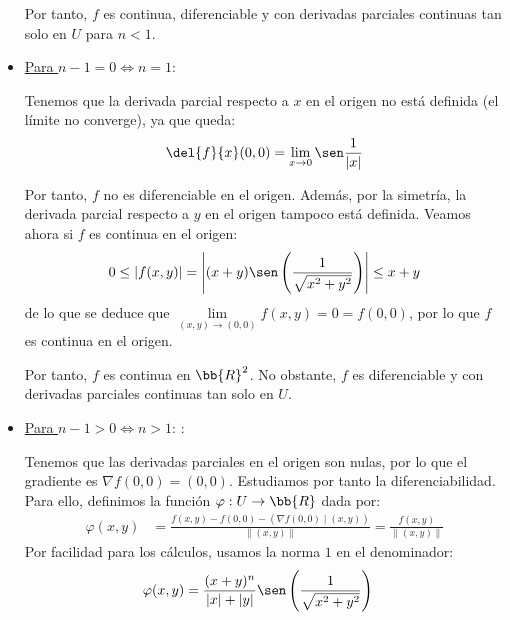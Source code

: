 \begin{ejercicio}
\begin{itemize}
        Por tanto, $f$ es continua, diferenciable y con derivadas parciales continuas tan solo en $U$ para $n<1$.

        \item \ul{Para $n-1=0 \Longleftrightarrow n=1$}:

        Tenemos que la derivada parcial respecto a $x$ en el origen no está definida (el límite no converge), ya que queda:
        \begin{equation*}
            \del{f}{x}(0,0) = \lim_{x\to 0} \sen\frac{1}{|x|}
        \end{equation*}
        
        Por tanto, $f$ no es diferenciable en el origen. Además, por la simetría, la derivada parcial respecto a $y$ en el origen tampoco está definida. Veamos ahora si $f$ es continua en el origen:
        \begin{equation*}
            0\leq |f(x,y)| = \left|(x+y) \sen\left(\frac{1}{\sqrt{x^2+y^2}}\right)\right| \leq x+y
        \end{equation*}
        de lo que se deduce que $\lim\limits_{(x,y)\to (0,0)}f(x,y) = 0 = f(0,0)$, por lo que $f$ es continua en el origen.

        Por tanto, $f$ es continua en $\bb{R}^2$. No obstante, $f$ es diferenciable y con derivadas parciales continuas tan solo en $U$.

        \item \ul{Para $n-1>0 \Longleftrightarrow n>1$}: :
        

        Tenemos que las derivadas parciales en el origen son nulas, por lo que el gradiente es $\nabla f(0,0) = (0,0)$. Estudiamos por tanto la diferenciabilidad. Para ello, definimos la función $\varphi:U\to \bb{R}$ dada por:
        \begin{equation*}\begin{split}
            \varphi(x,y) &= \frac{f(x,y) - f(0,0) - (\nabla f(0,0)\mid (x,y))}{\|(x,y)\|}
            = \frac{f(x,y)}{\|(x,y)\|}
        \end{split}\end{equation*}
        Por facilidad para los cálculos, usamos la norma $1$ en el denominador:
        \begin{equation*}\begin{split}
            \varphi(x,y) &= \frac{(x+y)^n}{|x|+|y|} \sen\left(\frac{1}{\sqrt{x^2+y^2}}\right)
        \end{split}\end{equation*}
        

\end{itemize}
\end{ejercicio}
